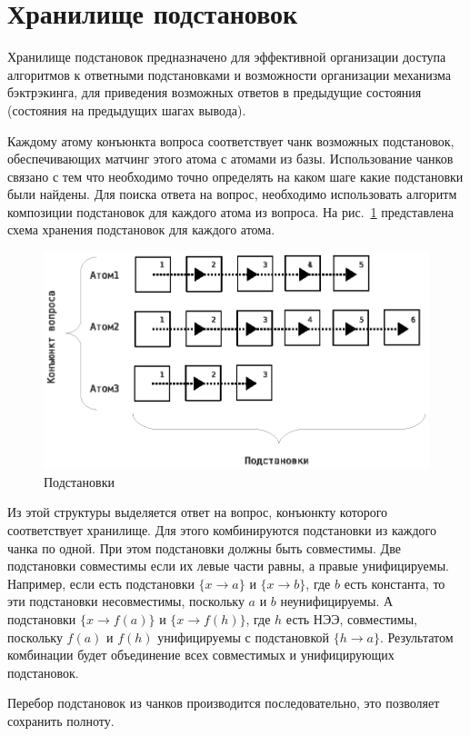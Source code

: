 \section{Хранилище подстановок}
Хранилище подстановок предназначено для эффективной организации доступа алгоритмов к ответными подстановками и возможности организации механизма бэктрэкинга, для приведения возможных ответов в предыдущие состояния (состояния на предыдущих шагах вывода).

Каждому атому конъюнкта вопроса соответствует чанк возможных подстановок, обеспечивающих матчинг этого атома с атомами из базы. Использование чанков связано с тем что необходимо точно определять на каком шаге какие подстановки были найдены. Для поиска ответа на вопрос, необходимо использовать алгоритм композиции подстановок для каждого атома из вопроса. На рис.~\ref{fig:anbase} представлена схема хранения подстановок для каждого атома.
\begin{figure}[h]
  \centering
  \includegraphics[width=0.6\linewidth]{pics/AnBase.eps}
  \caption{Подстановки}
  \label{fig:anbase}
\end{figure}

Из этой структуры выделяется ответ на вопрос, конъюнкту которого соответствует хранилище. Для этого комбинируются подстановки из каждого чанка по одной. При этом подстановки должны быть совместимы. Две подстановки совместимы если их левые части равны, а правые унифицируемы. Например, если есть подстановки $\{x \rightarrow a\}$ и $\{x \rightarrow b\}$, где $b$ есть константа, то эти подстановки несовместимы, поскольку $a$ и $b$ неунифицируемы. А подстановки $\{x \rightarrow f(a)\}$ и $\{x \rightarrow f(h)\}$, где $h$ есть НЭЭ, совместимы, поскольку $f(a)$ и $f(h)$ унифицируемы с подстановкой $\{h \rightarrow a\}$. Результатом комбинации будет объединение всех совместимых и унифицирующих подстановок.

Перебор подстановок из чанков производится последовательно, это позволяет сохранить полноту.



